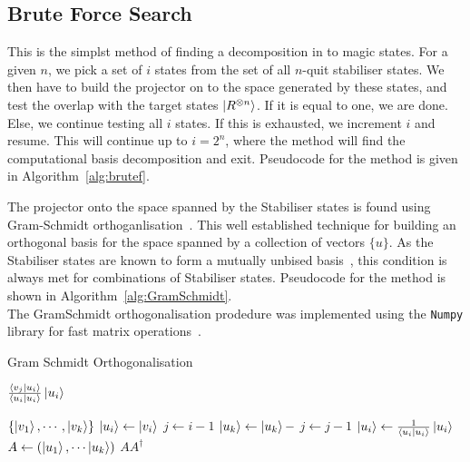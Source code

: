 \documentclass{standalone}
\begin{document}
\subsection{Brute Force Search}
This is the simplst method of finding a decomposition in to magic states. For a given $n$, we pick a set of $i$ states from the set of all $n$-quit stabiliser states. We then have to build the projector on to the space generated by these states, and test the overlap with the target states $\ket{R^{\otimes n}}$. If it is equal to one, we are done. Else, we continue testing all $i$ states. If this is exhausted, we increment $i$ and resume. This will continue up to $i=2^{n}$, where the method will find the computational basis decomposition and exit. Pseudocode for the method is given in Algorithm~\ref{alg:brutef}.
\par
The projector onto the space spanned by the Stabiliser states is found using Gram-Schmidt orthoganlisation~\cite{Nielsen2000}. This well established technique for building an orthogonal basis for the space spanned by a collection of vectors $\{u\}$. As the Stabiliser states are known to form a mutually unbised basis~\cite{Howard2013}, this condition is always met for combinations of Stabiliser states. Pseudocode for the method is shown in Algorithm~\ref{alg:GramSchmidt}.\\
The GramSchmidt orthogonalisation prodedure was implemented using the \texttt{Numpy} library for fast matrix operations~\cite{VanderWalt2011}.
\begin{algorithm}
\caption{Gram Schmidt Orthogonalisation}
\label{alg:GramSchmidt}
\begin{algorithmic}
    \State \Return $\frac{\braket{v_{j}}{u_{i}}}{\braket{u_{i}}{u_{i}}}\ket{u_{i}}$
\EndFunction
\end{algorithmic}
\begin{algorithmic}[1]
\Require $\{\ket{v_{1}},\cdots,\ket{v_{k}}\}$ 
    \State $\ket{u_{i}}\leftarrow\ket{v_{i}}$
    \State $j\leftarrow i-1$
        \State $\ket{u_{k}} \leftarrow \ket{u_{k}} -$ 
        \State $j\leftarrow j-1$
    \EndWhile
    \State $\ket{u_{i}}\leftarrow \frac{1}{\braket{u_{i}}{u_{i}}}\ket{u_{i}}$ 
\EndFor
\State $A\leftarrow \left(\ket{u_{1}},\cdots\ket{u_{k}}\right)$ 
\State \Return $AA^{\dagger}$ 
\end{algorithmic}
\end{algorithm}
\end{document}
